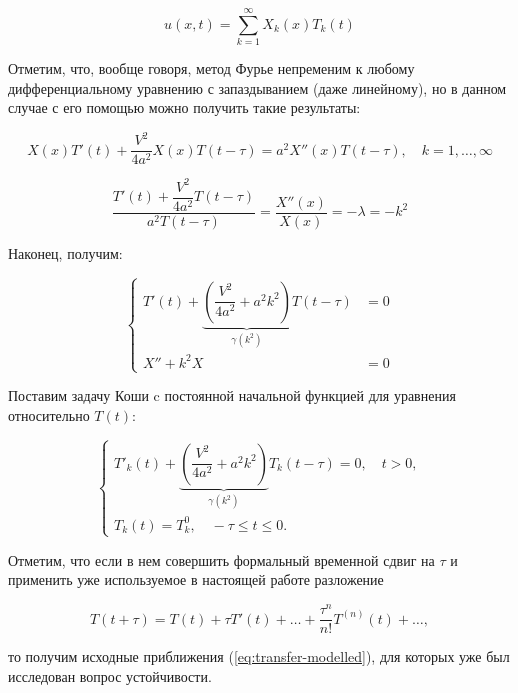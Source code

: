 \begin{equation}
u(x,t) = \sum\limits_{k=1}^{\infty} X_k(x) T_k(t)
\end{equation}

Отметим, что, вообще говоря, метод Фурье непременим к любому дифференциальному уравнению с запаздыванием (даже линейному), но в данном случае с его помощью можно получить такие результаты:

\begin{equation}
X(x) T'(t) + \dfrac{V^2}{4a^2} X(x) T(t-\tau) =a^2 X''(x) T(t-\tau), \quad k=1,\dots,\infty
\end{equation}

\begin{equation}
\dfrac{T'(t) + \dfrac{V^2}{4a^2} T(t-\tau)}{a^2 T(t-\tau)} = \dfrac{X''(x)}{X(x)} = -\lambda = -k^2
\end{equation}

Наконец, получим:

\begin{equation}
\left\{
\begin{aligned}
T'(t) + \underbrace{ \left( \dfrac{V^2}{4a^2} + a^2 k^2 \right)}_{\gamma(k^2)} T(t-\tau) & = 0\\
X'' + k^2 X & = 0
\end{aligned}
\right.
\end{equation}

Поставим задачу Коши c постоянной начальной функцией для уравнения относительно $T(t)$:

\begin{equation}\label{eq:Cauchy-delayed}
\left\{
\begin{aligned}
T'_k (t) + \underbrace{ \left( \dfrac{V^2}{4a^2} + a^2 k^2 \right)}_{\gamma(k^2)} T_k (t-\tau) = 0, \quad t>0,\\
T_k (t) = T_{k}^{0}, \quad -\tau \leq t \leq 0.
\end{aligned}
\right.
\end{equation}

Отметим, что если в нем совершить формальный временной сдвиг на $\tau$ и применить уже используемое в настоящей работе разложение

\begin{equation}
T(t+\tau) = T(t) + \tau T'(t) + \dots + \dfrac{\tau^n}{n!} T^{(n)} (t) + \dots,
\end{equation}

то получим исходные приближения (\ref{eq:transfer-modelled}), для которых уже был исследован вопрос устойчивости.

